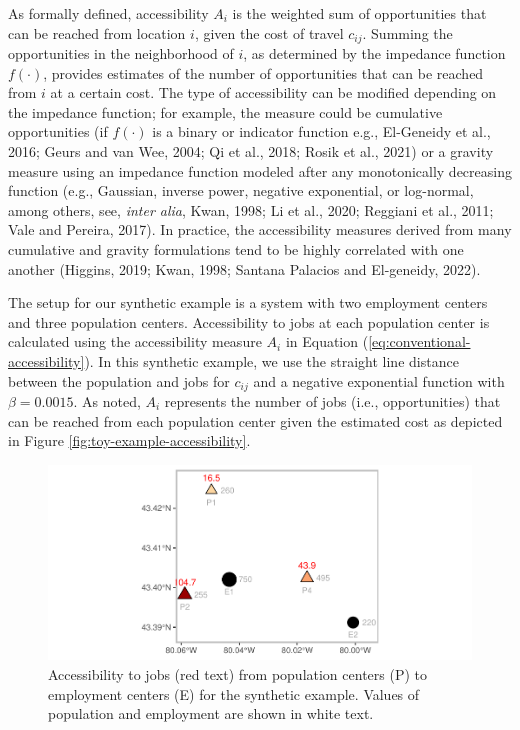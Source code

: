 \documentclass[]{elsarticle} %
\begin{document}
As formally defined, accessibility \(A_i\) is the weighted sum of
opportunities that can be reached from location \(i\), given the cost of
travel \(c_{ij}\). Summing the opportunities in the neighborhood of
\(i\), as determined by the impedance function \(f(\cdot)\), provides
estimates of the number of opportunities that can be reached from \(i\)
at a certain cost. The type of accessibility can be modified depending
on the impedance function; for example, the measure could be cumulative
opportunities (if \(f(\cdot)\) is a binary or indicator function e.g.,
El-Geneidy et al., 2016; Geurs and van Wee, 2004; Qi et al., 2018; Rosik
et al., 2021) or a gravity measure using an impedance function modeled
after any monotonically decreasing function (e.g., Gaussian, inverse
power, negative exponential, or log-normal, among others, see,
\emph{inter alia}, Kwan, 1998; Li et al., 2020; Reggiani et al., 2011;
Vale and Pereira, 2017). In practice, the accessibility measures derived
from many cumulative and gravity formulations tend to be highly
correlated with one another (Higgins, 2019; Kwan, 1998; Santana Palacios
and El-geneidy, 2022).

The setup for our synthetic example is a system with two employment
centers and three population centers. Accessibility to jobs at each
population center is calculated using the accessibility measure \(A_i\)
in Equation (\ref{eq:conventional-accessibility}). In this synthetic
example, we use the straight line distance between the population and
jobs for \(c_{ij}\) and a negative exponential function with
\(\beta = 0.0015\). As noted, \(A_i\) represents the number of jobs
(i.e., opportunities) that can be reached from each population center
given the estimated cost as depicted in Figure
\ref{fig:toy-example-accessibility}.

\begin{figure}
\includegraphics[width=1\linewidth]{Spatial-Availability-Refreshed_files/figure-latex/toy-example-accessibility-plot-1} \caption{\label{fig:toy-example-accessibility}Accessibility to jobs (red text) from population centers (P) to employment centers (E) for the synthetic example. Values of population and employment are shown in white text.}\label{fig:toy-example-accessibility-plot}
\end{figure}
\end{document}
